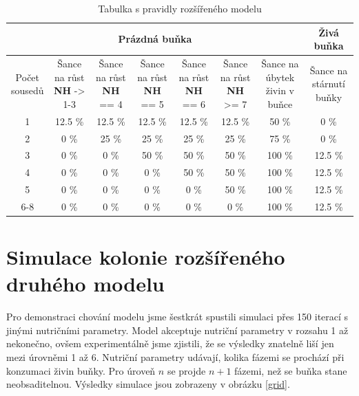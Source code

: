 \documentclass{article}
\begin{document}
\begin{table}[H]
    \centering    
    \begin{tabular}{|c|c|c|c|c|c|c|c|} \hline
        \multicolumn{7}{|c|}{\textbf{Prázdná buňka}} & \textbf{Živá buňka}\\ \hline
        \thead{Počet \\ sousedů} & \thead{Šance na růst \\ \textbf{NH} -> 1-3} & \thead{Šance na růst \\ \textbf{NH} == 4} & \thead{Šance na růst \\ \textbf{NH} == 5 } & \thead{Šance na růst \\ \textbf{NH} == 6} & \thead{Šance na růst \\ \textbf{NH} >= 7} & \thead{Šance na úbytek \\ živin v buňce} & \thead{Šance na \\ stárnutí buňky} \\ \hline
                1   &  12.5 \%   &   12.5 \%   &   12.5 \%  &   12.5 \%  &  12.5 \%  &   50 \%  &      0 \% \\ \hline
                2   &     0 \%   &     25 \%   &     25 \%  &     25 \%  &    25 \%  &   75 \%  &      0 \% \\ \hline
                3   &     0 \%   &      0 \%   &     50 \%  &     50 \%  &    50 \%  &  100 \%  &   12.5 \% \\ \hline
                4   &     0 \%   &      0 \%   &      0 \%  &     50 \%  &    50 \%  &  100 \%  &   12.5 \% \\ \hline
                5   &     0 \%   &      0 \%   &      0 \%  &      0 \%  &    50 \%  &  100 \%  &   12.5 \% \\ \hline
               6-8  &     0 \%   &      0 \%   &      0 \%  &      0 \%  &     0 \%  &  100 \%  &   12.5 \% \\ \hline
    \end{tabular}
    \caption{Tabulka s pravidly rozšířeného modelu}
    \label{model2ext_cellaging_table}
\end{table}

\section{Simulace kolonie rozšířeného druhého modelu}
Pro demonstraci chování modelu jsme šestkrát spustili simulaci přes 150 iterací s jinými nutričními parametry. Model akceptuje nutriční parametry v rozsahu 1 až nekonečno, ovšem experimentálně jsme zjistili, že se výsledky znatelně liší jen mezi úrovněmi 1 až 6. Nutriční parametry udávají, kolika fázemi se prochází při konzumaci živin buňky. Pro úroveň $n$ se projde $n + 1$ fázemi, než se buňka stane neobsaditelnou. Výsledky simulace jsou zobrazeny v obrázku
\ref{grid}.
\end{document}
